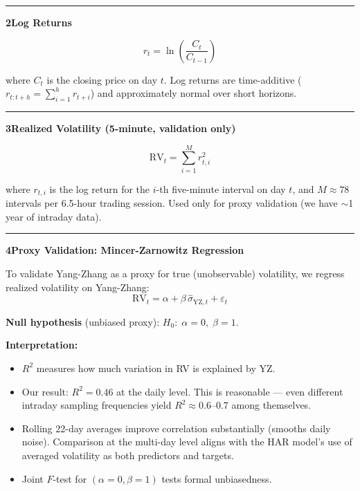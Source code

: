 \documentclass[10pt,a4paper]{article}
\newcommand{\sectionrule}{\vspace{0.3em}\hrule\vspace{0.5em}}
\begin{document}
\sectionrule

\textbf{2\quad Log Returns}

\begin{equation*}
r_t = \ln\!\left(\frac{C_t}{C_{t-1}}\right)
\end{equation*}

where $C_t$ is the closing price on day $t$. Log returns are time-additive
($r_{t:t+h} = \sum_{i=1}^{h} r_{t+i}$) and approximately normal over short
horizons.

\sectionrule

\textbf{3\quad Realized Volatility (5-minute, validation only)}

\begin{equation*}
\text{RV}_t = \sum_{i=1}^{M} r_{t,i}^2
\end{equation*}

where $r_{t,i}$ is the log return for the $i$-th five-minute interval on
day $t$, and $M \approx 78$ intervals per 6.5-hour trading session. Used
only for proxy validation (we have $\sim$1 year of intraday data).

\sectionrule

\textbf{4\quad Proxy Validation: Mincer-Zarnowitz Regression}

To validate Yang-Zhang as a proxy for true (unobservable) volatility, we
regress realized volatility on Yang-Zhang:
\begin{equation*}
\text{RV}_t = \alpha + \beta\,\hat{\sigma}_{\text{YZ},t} + \varepsilon_t
\end{equation*}

\textbf{Null hypothesis} (unbiased proxy): $H_0:\; \alpha = 0,\; \beta = 1$.

\textbf{Interpretation:}
\begin{itemize}
\item $R^2$ measures how much variation in RV is explained by YZ.
\item Our result: $R^2 = 0.46$ at the daily level. This is reasonable ---
  even different intraday sampling frequencies yield $R^2 \approx 0.6$--$0.7$
  among themselves.
\item Rolling 22-day averages improve correlation substantially (smooths
  daily noise). Comparison at the multi-day level aligns with the HAR model's
  use of averaged volatility as both predictors and targets.
\item Joint $F$-test for $(\alpha=0, \beta=1)$ tests formal unbiasedness.
\end{itemize}
\end{document}
